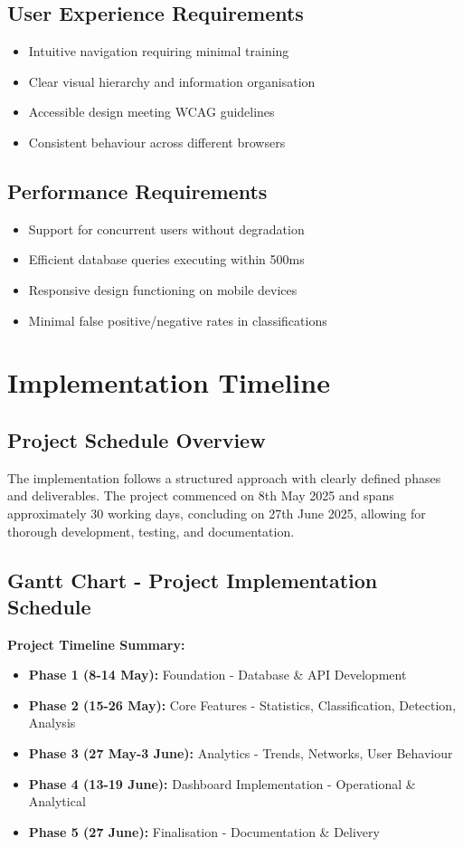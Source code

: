 \documentclass[11pt,a4paper]{article}
\begin{document}
\subsection{User Experience Requirements}
\begin{itemize}
    \item Intuitive navigation requiring minimal training
    \item Clear visual hierarchy and information organisation
    \item Accessible design meeting WCAG guidelines
    \item Consistent behaviour across different browsers
\end{itemize}

\subsection{Performance Requirements}
\begin{itemize}
    \item Support for concurrent users without degradation
    \item Efficient database queries executing within 500ms
    \item Responsive design functioning on mobile devices
    \item Minimal false positive/negative rates in classifications
\end{itemize}

\section{Implementation Timeline}

\subsection{Project Schedule Overview}
The implementation follows a structured approach with clearly defined phases and deliverables. The project commenced on 8th May 2025 and spans approximately 30 working days, concluding on 27th June 2025, allowing for thorough development, testing, and documentation.

\subsection{Gantt Chart - Project Implementation Schedule}

\textbf{Project Timeline Summary:}
\begin{itemize}
    \item \textbf{Phase 1 (8-14 May):} Foundation - Database \& API Development
    \item \textbf{Phase 2 (15-26 May):} Core Features - Statistics, Classification, Detection, Analysis
    \item \textbf{Phase 3 (27 May-3 June):} Analytics - Trends, Networks, User Behaviour
    \item \textbf{Phase 4 (13-19 June):} Dashboard Implementation - Operational \& Analytical
    \item \textbf{Phase 5 (27 June):} Finalisation - Documentation \& Delivery
\end{itemize}
\end{document}
